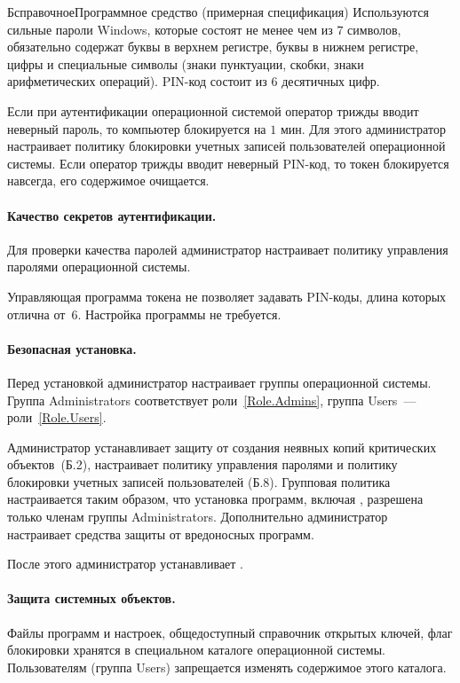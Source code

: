 \begin{appendix}{Б}{справочное}{Программное средство \CryptoDisk 
(примерная спецификация)}
Используются сильные пароли Windows, которые состоят не менее чем из $7$ символов,
обязательно содержат буквы в верхнем регистре,
буквы в нижнем регистре,
цифры и
специальные символы (знаки пунктуации, скобки, знаки арифметических операций).
%
PIN-код состоит из $6$ десятичных цифр.

Если при аутентификации операционной системой 
оператор трижды вводит неверный пароль, то компьютер блокируется на $1$ мин.
Для этого администратор настраивает 
политику блокировки учетных записей пользователей
операционной системы.
Если оператор трижды вводит неверный PIN-код, то токен 
блокируется навсегда, его содержимое очищается.

\paragraph*{Качество секретов аутентификации.}
Для проверки качества паролей администратор настраивает 
политику управления паролями операционной системы.

Управляющая программа токена не позволяет задавать PIN-коды,
длина которых отлична от~$6$. Настройка программы не требуется.


\paragraph*{Безопасная установка.}
Перед установкой \CryptoDisk администратор настраивает 
группы операционной системы.
Группа Administrators соответствует роли~\ref{Role.Admins},
группа Users~--- роли~\ref{Role.Users}.

Администратор устанавливает защиту от создания 
неявных копий критических объектов~(Б.2), 
настраивает политику управления паролями и 
политику блокировки учетных записей пользователей (Б.8).
%
Групповая политика настраивается таким образом, 
что установка программ, включая \CryptoDisk, 
разрешена только членам группы Administrators.
%
Дополнительно администратор настраивает средства 
защиты от вредоносных программ.

После этого администратор устанавливает \CryptoDisk.


\paragraph*{Защита системных объектов.}
Файлы программ и настроек, общедоступный справочник открытых 
ключей, флаг блокировки хранятся в специальном каталоге операционной системы.
Пользователям (группа Users) запрещается изменять содержимое этого каталога.


\end{appendix}
